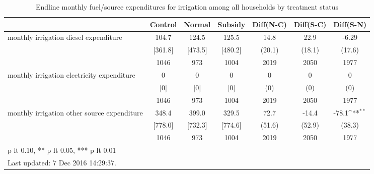 \begin{table}[htbp]\centering
\def\sym#1{\ifmmode^{#1}\else\(^{#1}\)\fi}
\caption{Endline monthly fuel/source expenditures for irrigation among all households by treatment status \label{tab:"balance"}}
\begin{tabular*}{1\hsize}{@{\hskip\tabcolsep\extracolsep\fill}l*{1}{cccccc}}
\toprule
                                &  Control&   Normal&  Subsidy&Diff(N-C)         &Diff(S-C)         &Diff(S-N)         \\
\midrule
monthly irrigation diesel expenditure&    104.7&    124.5&    125.5&     14.8         &     22.9         &    -6.29         \\
                                &  [361.8]&  [473.5]&  [480.2]&   (20.1)         &   (18.1)         &   (17.6)         \\
                                &     1046&      973&     1004&     2019         &     2050         &     1977         \\
monthly irrigation electricity expenditure&        0&        0&        0&        0         &        0         &        0         \\
                                &      [0]&      [0]&      [0]&      (0)         &      (0)         &      (0)         \\
                                &     1046&      973&     1004&     2019         &     2050         &     1977         \\
monthly irrigation other source expenditure&    348.4&    399.0&    329.5&     72.7         &    -14.4         &    -78.1\sym{**} \\
                                &  [778.0]&  [732.3]&  [774.6]&   (51.6)         &   (52.9)         &   (38.3)         \\
                                &     1046&      973&     1004&     2019         &     2050         &     1977         \\
\bottomrule
\multicolumn{7}{l}{\footnotesize * p lt 0.10, ** p lt 0.05, *** p lt 0.01}\\
\multicolumn{7}{l}{\footnotesize Last updated:  7 Dec 2016 14:29:37.}\\
\end{tabular*}
\end{table}
